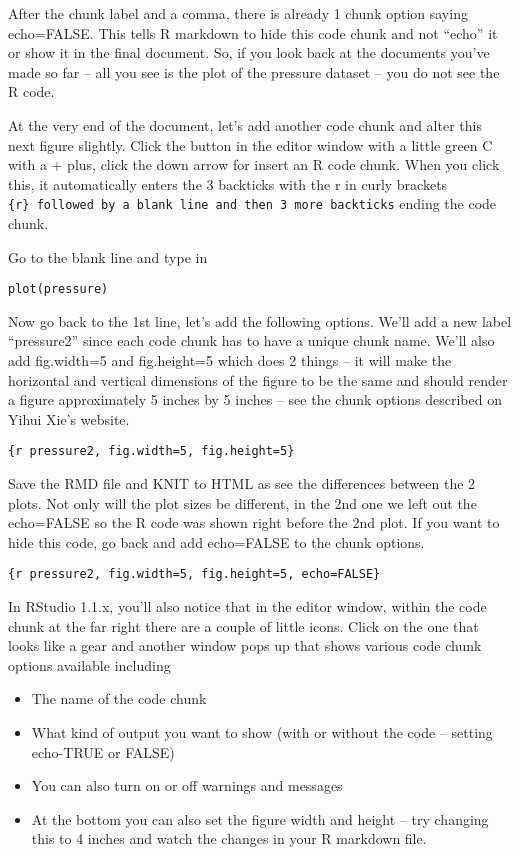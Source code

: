 \documentclass[
]{book}
\providecommand{\tightlist}{%
  \setlength{\itemsep}{0pt}\setlength{\parskip}{0pt}}
\begin{document}
After the chunk label and a comma, there is already 1 chunk option saying echo=FALSE. This tells R markdown to hide this code chunk and not ``echo'' it or show it in the final document. So, if you look back at the documents you've made so far -- all you see is the plot of the pressure dataset -- you do not see the R code.

At the very end of the document, let's add another code chunk and alter this next figure slightly. Click the button in the editor window with a little green C with a + plus, click the down arrow for insert an R code chunk. When you click this, it automatically enters the 3 backticks with the r in curly brackets \texttt{\{r\}\ followed\ by\ a\ blank\ line\ and\ then\ 3\ more\ backticks} ending the code chunk.

Go to the blank line and type in

\texttt{plot(pressure)}

Now go back to the 1st line, let's add the following options. We'll add a new label ``pressure2'' since each code chunk has to have a unique chunk name. We'll also add fig.width=5 and fig.height=5 which does 2 things -- it will make the horizontal and vertical dimensions of the figure to be the same and should render a figure approximately 5 inches by 5 inches -- see the chunk options described on Yihui Xie's website.

\texttt{\{r\ pressure2,\ fig.width=5,\ fig.height=5\}}

Save the RMD file and KNIT to HTML as see the differences between the 2 plots. Not only will the plot sizes be different, in the 2nd one we left out the echo=FALSE so the R code was shown right before the 2nd plot. If you want to hide this code, go back and add echo=FALSE to the chunk options.

\texttt{\{r\ pressure2,\ fig.width=5,\ fig.height=5,\ echo=FALSE\}}

In RStudio 1.1.x, you'll also notice that in the editor window, within the code chunk at the far right there are a couple of little icons. Click on the one that looks like a gear and another window pops up that shows various code chunk options available including

\begin{itemize}
\tightlist
\item
  The name of the code chunk
\item
  What kind of output you want to show (with or without the code -- setting echo-TRUE or FALSE)
\item
  You can also turn on or off warnings and messages
\item
  At the bottom you can also set the figure width and height -- try changing this to 4 inches and watch the changes in your R markdown file.
\end{itemize}
\end{document}

